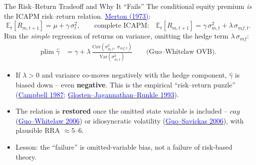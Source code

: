 \documentclass{beamer}
\newcommand{\E}{\mathbb{E}}
\newcommand{\Var}{\mathrm{Var}}
\newcommand{\Cov}{\mathrm{Cov}}
\begin{document}
\begin{frame}{The Risk--Return Tradeoff and Why It ``Fails''}
\small
The conditional equity premium \textit{is} the ICAPM risk--return relation. \href{https://doi.org/10.2307/1913811}{\textcolor{blue}{Merton (1973)}}:
\begin{equation*}
  \E_t[R_{m,t+1}] = \mu + \gamma\,\sigma_t^2,
  \qquad\text{complete ICAPM:}\quad
  \E_t[R_{m,t+1}] = \gamma\,\sigma_{m,t}^2 + \lambda\,\sigma_{mf,t}.
\end{equation*}
Run the \textit{simple} regression of returns on variance, omitting the hedge term $\lambda\,\sigma_{mf}$:
\begin{align*}
  \text{plim }\hat\gamma
  &= \gamma + \lambda\,\frac{\Cov(\sigma_{m,t}^2,\ \sigma_{mf,t})}{\Var(\sigma_{m,t}^2)}
  \qquad\text{(Guo--Whitelaw OVB).}
\end{align*}
\begin{itemize}
  \item If $\lambda>0$ and variance co-moves \alert{negatively} with the hedge component, $\hat\gamma$ is biased down -- even \textbf{negative}. This is the empirical ``risk--return puzzle'' (\href{https://doi.org/10.1016/0304-405X(87)90045-6}{\textcolor{blue}{Campbell 1987}}; \href{https://doi.org/10.1111/j.1540-6261.1993.tb05128.x}{\textcolor{blue}{Glosten--Jagannathan--Runkle 1993}}).
  \item The relation is \textbf{restored} once the omitted state variable is included -- $cay$ (\href{https://doi.org/10.1111/j.1540-6261.2006.00877.x}{\textcolor{blue}{Guo--Whitelaw 2006}}) or idiosyncratic volatility (\href{https://doi.org/10.1016/j.jfineco.2005.10.003}{\textcolor{blue}{Guo--Savickas 2006}}), with plausible RRA $\approx 5$--$6$.
  \item \alert{Lesson}: the ``failure'' is omitted-variable bias, not a failure of risk-based theory.
\end{itemize}
\end{frame}
\end{document}
